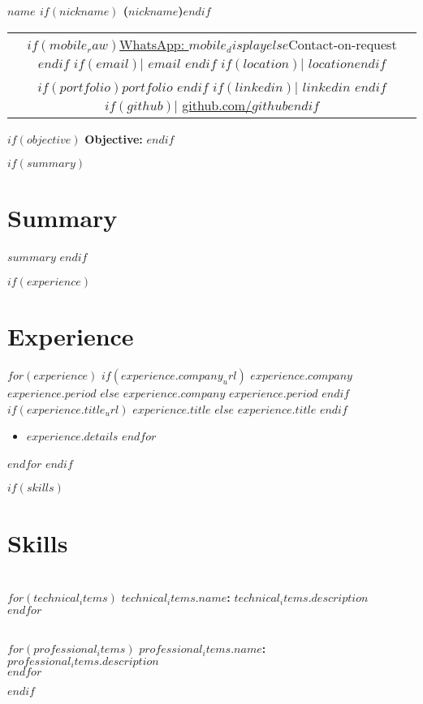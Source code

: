 \documentclass[10.5pt,a4paper]{article}
\newcommand{\daterange}[1]{\textbf{#1}}
\newcommand{\entryHeader}[2]{\noindent\textbf{#1} \hfill \daterange{#2}}
\newcommand{\entryHeaderLinked}[3]{\noindent\textbf{\href{#1}{#2}} \hfill \daterange{#3}}
\newcommand{\entrySubHeader}[1]{\textit{#1}}
\newcommand{\entrySubHeaderLinked}[2]{\textit{\href{#1}{#2}}}
\newenvironment{entryDetails}{%
  \begin{itemize}[leftmargin=*, itemsep=1pt, topsep=1pt, parsep=0pt]
}{%
  \end{itemize}
  \vspace{-0.1cm}
}
\begin{document}
\begin{center}
	{\LARGE \textbf{$name$ $if(nickname)$ ($nickname$)$endif$}}\\
	\begin{tabular}{@{}c@{}}
		$if(mobile_raw)$\href{https://wa.me/$country_code$$mobile_raw$}{WhatsApp: $mobile_display$}$else$Contact-on-request$endif$
		$if(email)$| \href{mailto:$email$}{$email$} $endif$
		$if(location)$| $location$$endif$                                                                      \\
		$if(portfolio)$\href{https://$portfolio$?utm_source=resume & utm_medium=document}{$portfolio$} $endif$
		$if(linkedin)$| \href{https://$linkedin$}{$linkedin$} $endif$
		$if(github)$| \href{https://github.com/$github$}{github.com/$github$}$endif$
	\end{tabular}
\end{center}

$if(objective)$
{\large\bfseries\color{sectioncolor}Objective:} 
\vspace{5pt}
$endif$

$if(summary)$
\section*{Summary}
$summary$
$endif$

$if(experience)$
\section*{Experience}
$for(experience)$
$if(experience.company_url)$
\entryHeaderLinked{$experience.company_url$}{$experience.company$}{$experience.period$}
$else$
\entryHeader{$experience.company$}{$experience.period$}
$endif$
\\
$if(experience.title_url)$
\entrySubHeaderLinked{$experience.title_url$}{$experience.title$}
$else$
\entrySubHeader{$experience.title$}
$endif$
\begin{entryDetails}
	$for(experience.details)$
	\item $experience.details$
	$endfor$
\end{entryDetails}
$endfor$
$endif$

$if(skills)$
\section*{Skills}
\begin{multicols}{2}
	\\
	$for(technical_items)$
	\noindent\textbf{$technical_items.name$:} $technical_items.description$\\[2pt]
	$endfor$

	\columnbreak

	\\
	$for(professional_items)$
	\noindent\textbf{$professional_items.name$:} $professional_items.description$\\[2pt]
	$endfor$
\end{multicols}
\vspace{-25pt}
$endif$
\end{document}
